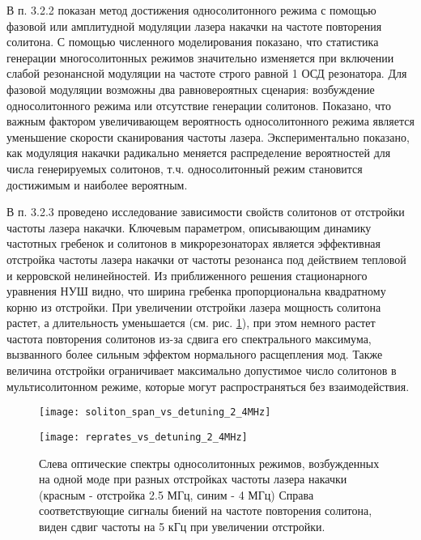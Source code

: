 В п. 3.2.2 показан метод достижения односолитонного режима с помощью фазовой или амплитудной модуляции лазера накачки на частоте повторения солитона. С помощью численного моделирования показано, что статистика генерации многосолитонных режимов значительно изменяется при включении слабой резонансной модуляции на частоте строго равной 1 ОСД резонатора. Для фазовой модуляции возможны два равновероятных сценария: возбуждение односолитонного режима или отсутствие генерации солитонов. Показано, что важным фактором увеличивающем вероятность односолитонного режима является уменьшение скорости сканирования частоты лазера. Экспериментально показано, как модуляция накачки радикально меняется распределение вероятностей для числа генерируемых солитонов, т.ч. односолитонный режим становится достижимым и наиболее вероятным.

В п. 3.2.3 проведено исследование зависимости свойств солитонов от отстройки частоты лазера накачки. Ключевым параметром, описывающим динамику частотных гребенок и солитонов в микрорезонаторах является эффективная отстройка частоты лазера накачки от частоты резонанса под действием тепловой и керровской нелинейностей. Из приближенного решения стационарного уравнения НУШ видно, что ширина гребенка пропорциональна квадратному корню из отстройки. При увеличении отстройки лазера мощность солитона растет, а длительность уменьшается (см. рис. \ref{detuning_dependant}), при этом немного растет частота повторения солитонов из-за сдвига его спектрального максимума, вызванного более сильным эффектом нормального расщепления мод. Также величина отстройки ограничивает максимально допустимое число солитонов в мультисолитонном режиме, которые могут распространяться без взаимодействия.

\begin{figure}[ht]
  \begin{minipage}[ht]{0.49\linewidth}\centering
    \texttt{[image: soliton\_span\_vs\_detuning\_2\_4MHz]}
  \end{minipage}
  \hfill
  \begin{minipage}[ht]{0.49\linewidth}\centering
    \texttt{[image: reprates\_vs\_detuning\_2\_4MHz]}
  \end{minipage}
  \caption{Слева оптические спектры односолитонных режимов, возбужденных на одной моде при разных отстройках частоты лазера накачки (красным - отстройка 2.5 МГц, синим - 4 МГц) Справа соответствующие сигналы биений на частоте повторения солитона, виден сдвиг частоты на 5 кГц при увеличении отстройки.}
  \label{detuning_dependant}
\end{figure}

